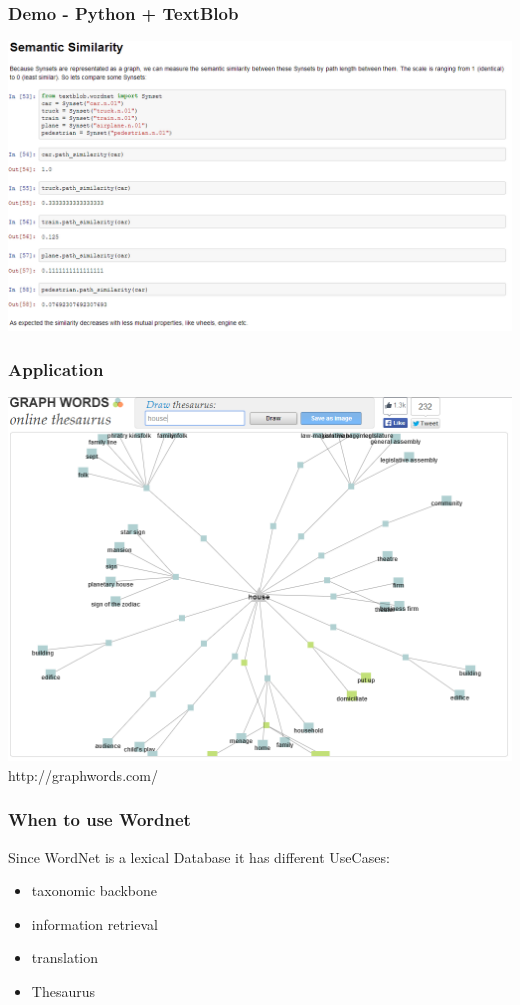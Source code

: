 \begin{frame}
\frametitle{Demo - Python + TextBlob}
\includegraphics[scale=0.29]{img/wordnet_ip4.PNG}\\
\end{frame}

\begin{frame}
\frametitle{Application}
\includegraphics[scale=0.29]{img/wordnet_app.png}\\
http://graphwords.com/
\end{frame}

\begin{frame}
\frametitle{When to use Wordnet}
Since WordNet is a lexical Database it has different UseCases:
\begin{itemize}
\item taxonomic backbone
\item information retrieval
\item translation
\item Thesaurus
\end{itemize}
\end{frame}


